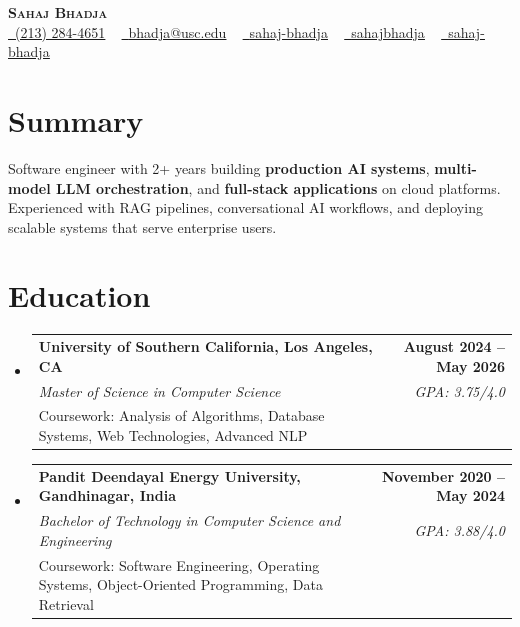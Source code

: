 \documentclass[letterpaper,10pt]{article}
\makeatletter
\newcommand{\resumeEduSubheading}[5]{\vspace{-1pt}\item\begin{tabular*}{1.0\textwidth}[t]{l@{\extracolsep{\fill}}r}\textbf{#1} & \textbf{\small #2} \\\textit{\small #3} & \textit{\small #4} \\\small #5 & \\\end{tabular*}\vspace{-4pt}}
\newcommand{\resumeSubHeadingListStart}{\begin{itemize}[leftmargin=0.0in, label={}]}
\newcommand{\resumeSubHeadingListEnd}{\end{itemize}}
\makeatother
\begin{document}
\begin{center}
{\Huge \scshape \textbf{Sahaj Bhadja}} \\ \vspace{1pt}
\small \href{tel:(213) 284-4651}{\faPhone\ \underline{(213) 284-4651}} ~ \href{mailto:bhadja@usc.edu}{\raisebox{-0.2\height}\faEnvelope\ \underline{bhadja@usc.edu}} ~
\href{https://www.linkedin.com/in/sahaj-bhadja/}{\raisebox{-0.2\height}\faLinkedin\ \underline{sahaj-bhadja}} ~ \href{https://github.com/SAHAJ-BHADJA}{\raisebox{-0.2\height}\faGithub\ \underline{sahajbhadja}} ~
\href{https://sahaj-bhadja.vercel.app/}{\raisebox{-0.2\height}\faGlobe\ \underline{sahaj-bhadja}}
\end{center}
\vspace{-18pt}
\section{Summary}
\begin{itemize}[leftmargin=0.15in, label={}]
\small{\item{Software engineer with 2+ years building \textbf{production AI systems}, \textbf{multi-model LLM orchestration}, and \textbf{full-stack applications} on cloud platforms. Experienced with RAG pipelines, conversational AI workflows, and deploying scalable systems that serve enterprise users.}}
\end{itemize}
\vspace{-16pt}
\section{Education}
\resumeSubHeadingListStart
\resumeEduSubheading{University of Southern California, Los Angeles, CA}{August 2024 -- May 2026}{Master of Science in Computer Science}{GPA: 3.75/4.0}{Coursework: Analysis of Algorithms, Database Systems, Web Technologies, Advanced NLP}
\vspace{-9pt}
\resumeEduSubheading{Pandit Deendayal Energy University, Gandhinagar, India}{November 2020 -- May 2024}{Bachelor of Technology in Computer Science and Engineering}{GPA: 3.88/4.0}{Coursework: Software Engineering, Operating Systems, Object-Oriented Programming, Data Retrieval}
\resumeSubHeadingListEnd
\vspace{-14pt}
\end{document}
